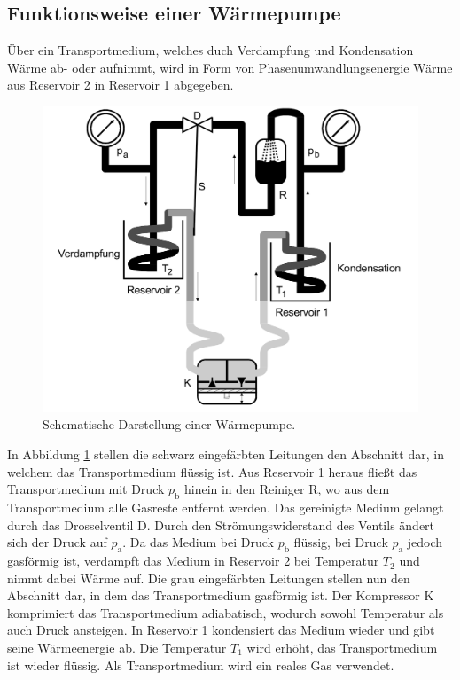\documentclass{scrartcl} %
\begin{document}
    \subsection{Funktionsweise einer Wärmepumpe}
      Über ein Transportmedium, welches duch Verdampfung und Kondensation Wärme ab- oder aufnimmt,
      wird in Form von Phasenumwandlungsenergie Wärme aus Reservoir 2 in Reservoir 1 abgegeben.
      \begin{figure}
        \centering
        \includegraphics[scale = 0.15]{AufbauWaermepumpe.png}
        \caption{Schematische Darstellung einer Wärmepumpe.}
        \label{fig:wärmepumpe1}
      \end{figure}
      In Abbildung \ref{fig:wärmepumpe1} stellen die schwarz eingefärbten Leitungen den Abschnitt dar, in welchem das Transportmedium flüssig ist.
      Aus Reservoir 1 heraus fließt das Transportmedium mit Druck $p_\text{b}$ hinein in den Reiniger R, wo aus dem Transportmedium alle Gasreste entfernt werden.
      Das gereinigte Medium gelangt durch das Drosselventil D. Durch den Strömungswiderstand des Ventils ändert sich der Druck auf $p_\text{a}$. Da das Medium bei Druck $p_\text{b}$
      flüssig, bei Druck $p_\text{a}$ jedoch gasförmig ist, verdampft das Medium in Reservoir 2 bei Temperatur $T_\text{2}$ und nimmt dabei Wärme auf. Die grau eingefärbten Leitungen
      stellen nun den Abschnitt dar, in dem das Transportmedium gasförmig ist. Der Kompressor K komprimiert das Transportmedium adiabatisch,
      wodurch sowohl Temperatur als auch Druck ansteigen.
      In Reservoir 1 kondensiert das Medium wieder und gibt seine Wärmeenergie ab. Die Temperatur $T_\text{1}$ wird erhöht, das
      Transportmedium ist wieder flüssig. Als Transportmedium wird ein reales Gas verwendet.
\end{document}
